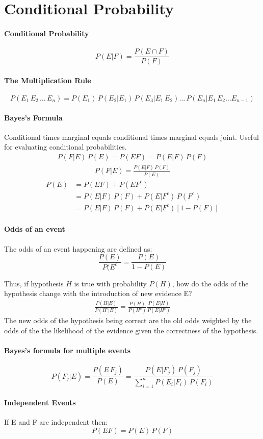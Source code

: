 \documentclass[12pt]{article}
\begin{document}
\section{Conditional Probability}

\paragraph{Conditional Probability}

\[
P(E|F) = \frac{P(E \cap F)}{P(F)}
\]

\paragraph{The Multiplication Rule}
\[
P(E_1\,E_2\,\dots\, E_n) = P(E_1)\,P(E_2|E_1)\,P(E_3|E_1\,E_2)\dots \,P(E_n|E_1\,E_2 \dots E_{n-1})
\]


\paragraph{Bayes's Formula}
Conditional times marginal equals conditional times marginal equals joint. Useful for evaluating conditional probabilities. 
\begin{align*}
P(F|E)\,P(E)= P(EF) = P(E|F)\,P(F)  
\end{align*}
%
\begin{align*}
P(F|E) = \frac{ P(E|F)\,P(F) }{P(E)}
\end{align*}
%
\begin{align*}
P(E) &= P(EF) + P(EF^c) \\
     &= P(E|F)\,P(F) + P(E|F^c)\,P(F^c) \\
     &= P(E|F)\,P(F) + P(E|F^c)[1-P(F)]
\end{align*}

\paragraph{Odds of an event}
The odds of an event happening are defined as:
\[
\frac{P(E)}{P(E^c} = \frac{P(E)}{1-P(E)}
\]


Thus, if hypothesis $H$ is true with probability $P(H)$, how do the odds of the hypothesis change with the introduction of new evidence E?
\begin{align*}
\frac{P(H|E)}{P(H^c|E)} = \frac{P(H)}{P(H^c)} \frac{P(E|H)}{P(E|H^c)}
\end{align*}
%
The new odds of the hypothesis being correct are the old odds weighted by the odds of the the likelihood of the evidence given the correctness of the hypothesis. 


\paragraph{Bayes's formula for multiple events}
\[
P(F_j|E) = \frac{P(E\,F_j)}{P(E)} = \frac{P(E|F_j)\,P(F_j)}{\sum^n_{i=1} P(E_i|F_i)\,P(F_i) }
\]

\paragraph{Independent Events} If E and F are independent then:
\[
P(EF) = P(E)\,P(F)
\]
\end{document}
